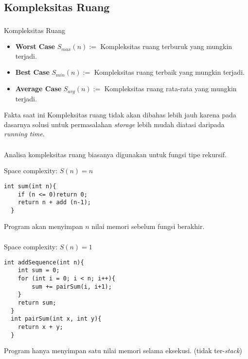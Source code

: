 \documentclass{../praktikum-ppt}
\begin{document}
\subsection{Kompleksitas Ruang}
\begin{frame}
  \frametitle{\insertsection}
  \framesubtitle{\insertsubsection}
  \begin{block}{Kompleksitas Ruang}
    \begin{itemize}
      \item \textbf{Worst Case} $S_{max}(n):=$ Kompleksitas ruang terburuk yang mungkin terjadi.
      \item \textbf{Best Case} $S_{min}(n):=$ Kompleksitas ruang terbaik yang mungkin terjadi.
      \item \textbf{Average Case} $S_{avg}(n):=$ Kompleksitas ruang rata-rata yang mungkin terjadi.
    \end{itemize}
  \end{block}
  \begin{alertblock}{Fakta saat ini}
     Kompleksitas ruang tidak akan dibahas lebih jauh karena pada dasarnya solusi untuk permasalahan \textit{storage} lebih mudah diatasi daripada \textit{running time}. 
  \end{alertblock}
\end{frame}

\begin{frame}[fragile]
  \frametitle{\insertsection}
  \framesubtitle{\insertsubsection}
  Analisa kompleksitas ruang biasanya digunakan untuk fungsi tipe rekursif.
  \begin{contoh}
    Space complexity: $S(n)=n$
  \end{contoh}
  \begin{lstlisting}[caption={Jumlahan $n$},captionpos=b]
  int sum(int n){
    if (n <= 0)return 0;
    return n + add (n-1);
  }
  \end{lstlisting}
  Program akan menyimpan $n$ nilai memori sebelum fungsi berakhir.
\end{frame}

\begin{frame}[fragile]
  \frametitle{\insertsection}
  \framesubtitle{\insertsubsection}
  \begin{contoh}
    Space complexity: $S(n)=1$
  \end{contoh}
  \begin{lstlisting}[caption={Faktorial},captionpos=b]
  int addSequence(int n){
    int sum = 0;
    for (int i = 0; i < n; i++){
        sum += pairSum(i, i+1);
    }
    return sum;
  }
  int pairSum(int x, int y){
    return x + y;
  }
  \end{lstlisting}
  Program hanya menyimpan satu nilai memori selama eksekusi. (tidak ter-\textit{stack})
\end{frame}
\end{document}
